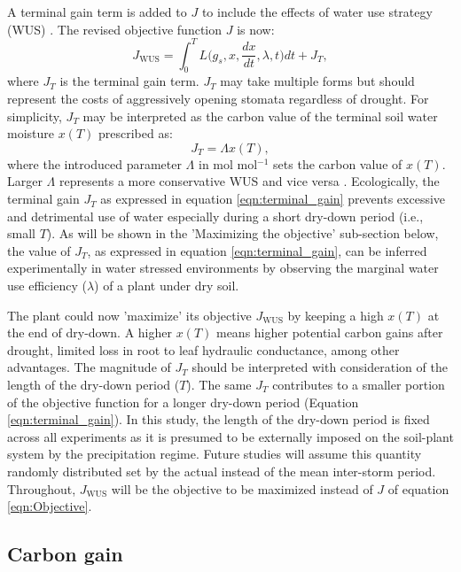 \documentclass[utf8]{frontiersSCNS} %
\begin{document}
A terminal gain term is added to $J$ to include the effects of water use strategy (WUS) \citep{manzoni_optimization_2013}. The revised objective function $J$ is now:
\begin{equation}
    \label{eqn:Objective_WUS}
    J_{\text{WUS}} = \int_0^{T} L\Big(g_s, x, \frac{dx}{dt},\lambda,t \Big) dt + J_{T},
\end{equation}
where $J_T$ is the terminal gain term. $J_T$ may take multiple forms but should represent the costs of aggressively opening stomata regardless of drought. For simplicity, $J_T$ may be interpreted as the carbon value of the terminal soil water moisture $x(T)$ prescribed as:
\begin{equation}
    \label{eqn:terminal_gain}
    J_{T} = \Lambda x(T),
\end{equation}
where the introduced parameter $\Lambda$ in mol mol$^{-1}$ sets the carbon value of $x(T)$. Larger $\Lambda$ represents a more conservative WUS and vice versa \citep{manzoni_optimization_2013}. Ecologically, the terminal gain $J_{T}$ as expressed in equation \ref{eqn:terminal_gain} prevents excessive and detrimental use of water especially during a short dry-down period (i.e., small $T$). As will be shown in the 'Maximizing the objective' sub-section below, the value of $J_T$, as expressed in equation \ref{eqn:terminal_gain}, can be inferred experimentally in water stressed environments by observing the marginal water use efficiency ($\lambda$) of a plant under dry soil. 

The plant could now 'maximize' its objective $J_{\text{WUS}}$ by keeping a high $x(T)$ at the end of dry-down. A higher $x(T)$ means higher potential carbon gains after drought, limited loss in root to leaf hydraulic conductance, among other advantages.  The magnitude of $J_{T}$ should be interpreted with consideration of the length of the dry-down period ($T$). The same $J_{T}$ contributes to a smaller portion of the objective function for a longer dry-down period (Equation \ref{eqn:terminal_gain}). In this study, the length of the dry-down period is fixed across all experiments as it is presumed to be externally imposed on the soil-plant system by the precipitation regime. Future studies will assume this quantity randomly distributed set by the actual instead of the mean inter-storm period.  Throughout, $J_{\text{WUS}}$ will be the objective to be maximized instead of $J$ of equation \ref{eqn:Objective}.

\subsection{Carbon gain}
\end{document}
